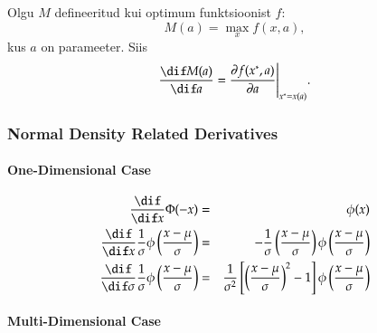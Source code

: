 \documentclass[a4paper]{article}
\numberwithin{equation}{subsection}
\begin{document}
Olgu $M$ defineeritud kui optimum funktsioonist $f$:
\begin{equation}
  M(a) = \max_{x} f(x, a),
\end{equation}
kus $a$ on parameeter.  Siis
\begin{equation}
  \frac{\dif M(a)}{\dif a} =  \frac{\partial f(x^*, a)}{ \partial a} \Bigg|_{x^* = x(a)}.
\end{equation}





\subsubsection{Normal Density Related Derivatives}

\paragraph{One-Dimensional Case}
\begin{eqnarray}
\frac{\dif}{\dif x} \Phi(-x) &=&
  \phi(x) \\
%
\frac{\dif}{\dif x} 
\frac{1}{\sigma} 
\phi \left( \frac{x-\mu}{\sigma} \right) &=&
  - \frac{1}{\sigma} 
    \left( \frac{x-\mu}{\sigma} \right)
    \phi \left( \frac{x-\mu}{\sigma} \right)
\\
\frac{\dif}{\dif \sigma} 
\frac{1}{\sigma} 
\phi \left( \frac{x-\mu}{\sigma} \right) &=&
    \frac{1}{\sigma^{2}} 
    \left[ \left( \frac{x-\mu}{\sigma} \right)^{2} - 1 \right]
    \phi \left( \frac{x-\mu}{\sigma} \right)
\end{eqnarray}

\paragraph{Multi-Dimensional Case}
\end{document}
